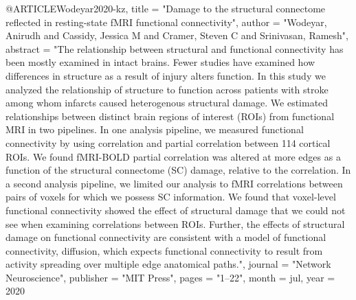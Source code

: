 @ARTICLE{Wodeyar2020-kz,
	title     = "Damage to the structural connectome reflected in resting-state
	{fMRI} functional connectivity",
	author    = "Wodeyar, Anirudh and Cassidy, Jessica M and Cramer, Steven C and
	Srinivasan, Ramesh",
	abstract  = "The relationship between structural and functional connectivity
	has been mostly examined in intact brains. Fewer studies have
	examined how differences in structure as a result of injury
	alters function. In this study we analyzed the relationship of
	structure to function across patients with stroke among whom
	infarcts caused heterogenous structural damage. We estimated
	relationships between distinct brain regions of interest (ROIs)
	from functional MRI in two pipelines. In one analysis pipeline,
	we measured functional connectivity by using correlation and
	partial correlation between 114 cortical ROIs. We found
	fMRI-BOLD partial correlation was altered at more edges as a
	function of the structural connectome (SC) damage, relative to
	the correlation. In a second analysis pipeline, we limited our
	analysis to fMRI correlations between pairs of voxels for which
	we possess SC information. We found that voxel-level functional
	connectivity showed the effect of structural damage that we
	could not see when examining correlations between ROIs. Further,
	the effects of structural damage on functional connectivity are
	consistent with a model of functional connectivity, diffusion,
	which expects functional connectivity to result from activity
	spreading over multiple edge anatomical paths.",
	journal   = "Network Neuroscience",
	publisher = "MIT Press",
	pages     = "1--22",
	month     =  jul,
	year      =  2020
}

